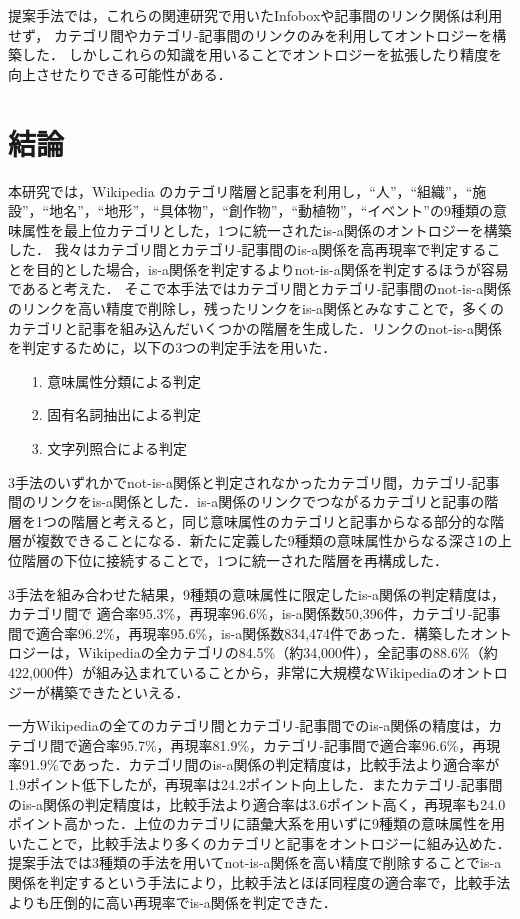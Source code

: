 \documentclass[japanese]{jnlp_1.4}
\begin{document}
提案手法では，これらの関連研究で用いたInfoboxや記事間のリンク関係は利用せず，
カテゴリ間やカテゴリ‐記事間のリンクのみを利用してオントロジーを構築した．
しかしこれらの知識を用いることでオントロジーを拡張したり精度を向上させたりできる可能性がある．


\section{結論}
\label{sec:ketsuron}

本研究では，Wikipedia のカテゴリ階層と記事を利用し，``人''，``組織''，``施設''，``地名''，\mbox{``地}形''，``具体物''，``創作物''，``動植物''，``イベント''の9種類の意味属性を最上位カテゴリとした，1つに統一されたis-a関係のオントロジーを構築した．
我々はカテゴリ間とカテゴリ‐記事間のis-a関係を高再現率で判定することを目的とした場合，is-a関係を判定するよりnot-is-a関係を判定するほうが容易であると考えた．
そこで本手法ではカテゴリ間とカテゴリ‐記事間のnot-is-a関係のリンクを高い精度で削除し，残ったリンクをis-a関係とみなすことで，多くのカテゴリと記事を組み込んだいくつかの階層を生成した．リンクのnot-is-a関係を判定するために，以下の3つの判定手法を用いた．

\begin{itemize}
\item[1.]
意味属性分類による判定
\item[2.]
固有名詞抽出による判定
\item[3.]
文字列照合による判定
\end{itemize}

\noindent
3手法のいずれかでnot-is-a関係と判定されなかったカテゴリ間，カテゴリ‐記事間のリンクをis-a関係とした．is-a関係のリンクでつながるカテゴリと記事の階層を1つの階層と考えると，同じ意味属性のカテゴリと記事からなる部分的な階層が複数できることになる．新たに定義した9種類の意味属性からなる深さ1の上位階層の下位に接続することで，1つに統一された階層を再構成した．

3手法を組み合わせた結果，9種類の意味属性に限定したis-a関係の判定精度は，カテゴリ間で
適合率95.3\%，再現率96.6\%，is-a関係数50,396件，カテゴリ‐記事間で適合率96.2\%，再現率95.6\%，is-a関係数834,474件であった．構築したオントロジーは，Wikipediaの全カテゴリの84.5\%（約34,000件），全記事の88.6\%（約422,000件）が組み込まれていることから，非常に大規模なWikipediaのオントロジーが構築できたといえる．

一方Wikipediaの全てのカテゴリ間とカテゴリ‐記事間でのis-a関係の精度は，カテゴリ間で適合率95.7\%，再現率81.9\%，カテゴリ‐記事間で適合率96.6\%，再現率91.9\%であった．カテゴリ間のis-a関係の判定精度は，比較手法より適合率が1.9ポイント低下したが，再現率は24.2ポイント向上した．またカテゴリ‐記事間のis-a関係の判定精度は，比較手法より適合率は3.6ポイント高く，再現率も24.0ポイント高かった．上位のカテゴリに語彙大系を用いずに9種類の意味属性を用いたことで，比較手法より多くのカテゴリと記事をオントロジーに組み込めた．提案手法では3種類の手法を用いてnot-is-a関係を高い精度で削除することでis-a関係を判定するという手法により，比較手法とほぼ同程度の適合率で，比較手法よりも圧倒的に高い再現率でis-a関係を判定できた．
\end{document}
